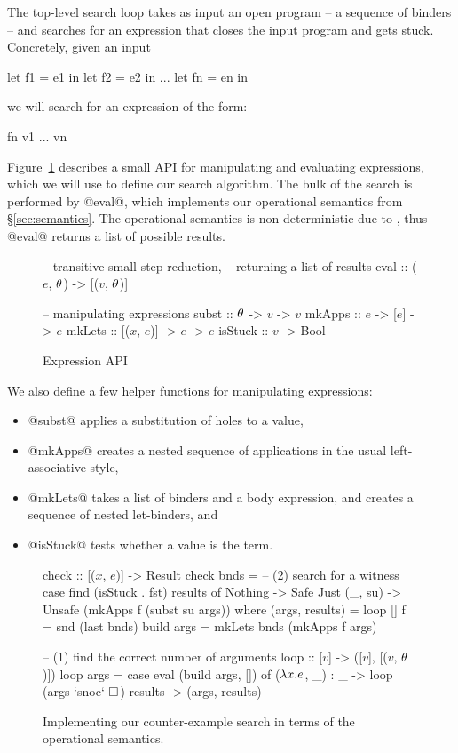 The top-level search loop takes as input an open program -- a sequence
of binders -- and searches for an expression that closes the input
program and gets stuck. Concretely, given an input
%
\begin{code}
  let f1 = e1 in
  let f2 = e2 in
  ...
  let fn = en in
\end{code}
%
we will search for an expression of the form:
%
\begin{code}
  fn v1 ... vn
\end{code}
%
Figure~\ref{fig:expression-api} describes a small API for manipulating
and evaluating \lang expressions, which we will use to define our search
algorithm.
%
The bulk of the search is performed by @eval@, which
implements our operational semantics from \S\ref{sec:semantics}.
%
The operational semantics is non-deterministic due to \gensym,
thus @eval@ returns a list of possible results.
%
\begin{figure}[t]
  \centering
  \begin{mcode}
  -- transitive small-step reduction, 
  -- returning a list of results
  eval :: ($e$, $\theta$) -> [($v$, $\theta$)]
  
  -- manipulating expressions
  subst   :: $\theta$ -> $v$ -> $v$
  mkApps  :: $e$ -> [$e$] -> $e$
  mkLets  :: [($x$, $e$)] -> $e$ -> $e$
  isStuck :: $v$ -> Bool
  \end{mcode}
  \caption{Expression API}
  \label{fig:expression-api}
\end{figure}
%
We also define a few helper functions for manipulating expressions:
\begin{itemize}
\item @subst@ applies a substitution of holes to a value,
\item @mkApps@ creates a nested sequence of applications in the usual
  left-associative style,
\item @mkLets@ takes a list of binders and a body expression, and
  creates a sequence of nested let-binders, and
\item @isStuck@ tests whether a value is the \stuck term.
\end{itemize}
%
\begin{figure*}[t]
  \centering
  \begin{mcode}
  check :: [($x$, $e$)] -> Result
  check bnds =
    -- (2) search for a witness
    case find (isStuck . fst) results of
      Nothing      -> Safe
      Just (_, su) -> Unsafe (mkApps f (subst su args))
    where
      (args, results) = loop []
      f               = snd (last bnds)
      build args      = mkLets bnds (mkApps f args)

      -- (1) find the correct number of arguments
      loop :: [$v$] -> ([$v$], [($v$, $\theta$)])
      loop args = case eval (build args, []) of 
        ($\lambda x. e$, _) : _ -> loop (args `snoc` $\square_{}$)
        results      -> (args, results)  
  \end{mcode}
  \caption{Implementing our counter-example search in terms of the
    operational semantics. 
  }
  \label{fig:search-algo}
\end{figure*}
